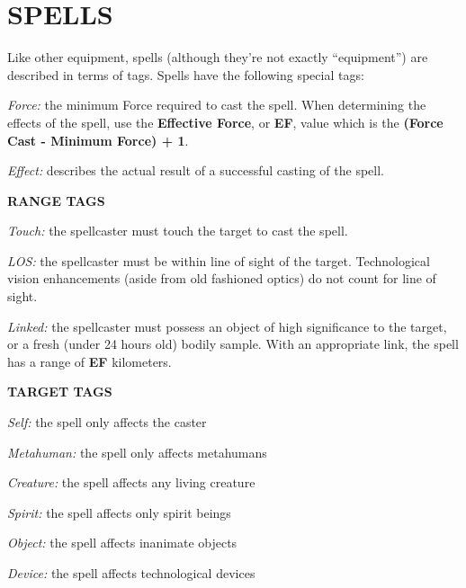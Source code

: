 \documentclass[oneside,10pt]{article}
\begin{document}
\section{SPELLS}
\begin{multicols}{2}
Like other equipment, spells (although they’re not exactly 
  “equipment”) are described in terms of tags. Spells have the 
      following special tags: 

\begin{adjustwidth*}{.5cm}{.5cm}

      \textit{Force:} the minimum Force required to 
      cast the spell. When determining the effects of the spell, use the \textbf{Effective Force}, or \textbf{EF}, value which is the \textbf{(Force Cast - Minimum Force) + 1}.

      \textit{Effect:} describes the actual result of a successful casting of 
      the spell. 
\end{adjustwidth*}

\textbf{RANGE TAGS }


\begin{adjustwidth*}{.5cm}{.5cm}

\textit{Touch:} the spellcaster must touch the target to cast the
spell.

\textit{LOS:} the spellcaster must be within line of sight of the target. Technological vision enhancements (aside from old fashioned optics) do not count for line of sight.

\textit{Linked:} the spellcaster must possess an object of high significance to the target, or a fresh (under 24 hours old) bodily sample. With an appropriate link, the spell has a range of \textbf{EF} kilometers.

\end{adjustwidth*}

\textbf{TARGET TAGS}

\begin{adjustwidth*}{.5cm}{.5cm}

\textit{Self:} the spell only affects the caster

\textit{Metahuman:} the spell only affects metahumans

\textit{Creature:} the spell affects any living creature

\textit{Spirit:} the spell affects only spirit beings

\textit{Object:} the spell affects inanimate objects

\textit{Device:} the spell affects technological devices
\end{adjustwidth*}


\end{multicols}
\end{document}
